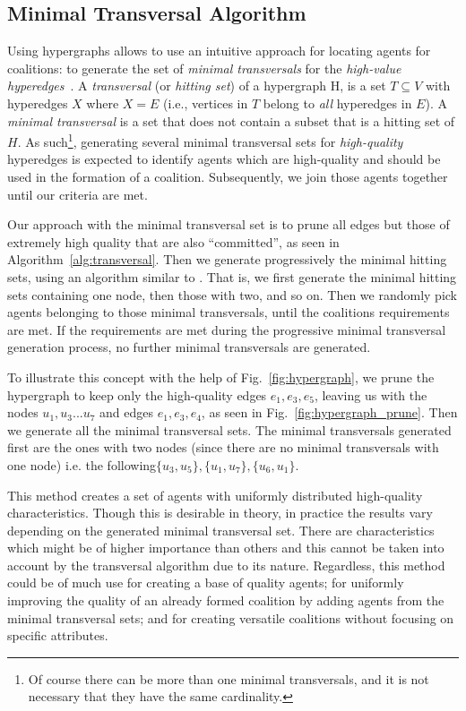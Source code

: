\subsection{Minimal Transversal Algorithm} \label{sec:transversal}
Using hypergraphs allows to use an intuitive approach  for locating agents for coalitions: to generate the set of \textit{minimal transversals} for the \textit{high-value hyperedges}~\cite{eiter1995identifying}. A \textit{transversal} (or \textit{hitting set}) of a hypergraph H, is a set $T\subseteq V$ with hyperedges $X$ where $X = E$ (i.e., vertices in $T$ belong to \textit{all} hyperedges in $E$). A \textit{minimal transversal} is a set that does not contain a subset that is a hitting set of $H$.  As such\footnote{Of course there can be more than one minimal transversals, and it is not necessary that they have the same cardinality.}, generating several minimal transversal sets for \textit{high-quality} hyperedges is expected to identify agents which are high-quality and should be used in the formation of a coalition. Subsequently, we join those agents together until our criteria are met. 

Our approach with the minimal transversal set is to prune all edges but those of extremely high quality that are also ``committed'', as seen in Algorithm~\ref{alg:transversal}. Then we generate progressively the minimal hitting sets, using an algorithm similar to \cite{eiter1995identifying}. That is, we first generate the minimal hitting sets containing one node, then those with two, and so on. Then we randomly pick agents belonging to those minimal transversals, until the coalitions requirements are met. If the requirements are met during the progressive minimal transversal generation process, no further minimal transversals are generated.

To illustrate this concept with the help of Fig.~\ref{fig:hypergraph}, we prune the hypergraph to keep only the high-quality edges $e_1, e_3, e_5$, leaving us with the nodes $u_1, u_3...u_7$ and edges $e_1, e_3, e_4$, as seen in Fig.~\ref{fig:hypergraph_prune}. Then we generate all the minimal transversal sets. The minimal transversals generated first are the ones with two nodes (since there are no minimal transversals with one node) i.e. the following$\{u_3, u_5\}, \{u_1,u_7\}, \{ u_6, u_1\}$.%

This method creates a set of agents with uniformly distributed high-quality characteristics. Though this is desirable in theory, in practice the results vary depending on the generated minimal transversal set. There are characteristics which might be of higher importance than others and this cannot be taken into account by the transversal algorithm due to its nature. Regardless, this method could be of much use for creating a base of quality agents; for uniformly improving the quality of an already formed coalition by adding agents from the minimal transversal sets; and for creating versatile coalitions without focusing on specific attributes.

